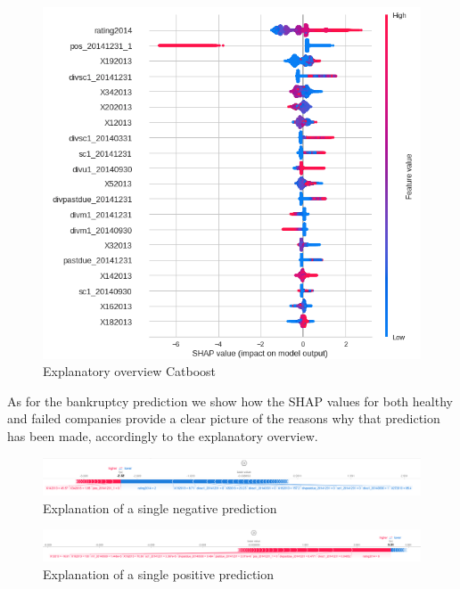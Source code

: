 \begin{figure}[H]

\includegraphics[scale = 0.7]{latex/figs/adjusted_exp.png}
\caption{Explanatory overview Catboost}
\end{figure}

As for the bankruptcy prediction we show how the SHAP values for both healthy and failed companies provide a clear picture of the reasons why that prediction has been made, accordingly to the explanatory overview.
\begin{figure}[H]
\flushleft
\includegraphics[scale=0.4]{latex/figs/adjusted1_exp.png}
\caption{Explanation of a single negative prediction}
\end{figure}

\begin{figure}[H]

\includegraphics[scale=0.28]{latex/figs/adjusted2_exp.png}
\caption{Explanation of a single positive prediction}


\end{figure}

